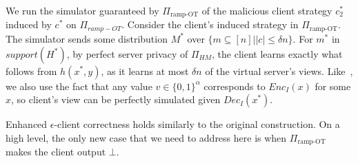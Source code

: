 \documentclass{llncs}
\begin{document}
{We run the simulator guaranteed by $\Pi_{\text{ramp-OT}}$ of the malicious client strategy $c^*_2$ induced by $c^*$ on $\Pi_{ramp-OT}$. 
Consider the client's induced strategy in $\Pi_{\text{ramp-OT}}$. The simulator sends some distribution $M^*$ over $\{m\subseteq [n]||c|\leq \delta n\}$.
For $m^*$ in $support(H^*)$, by perfect server privacy of $\Pi_{HM}$, the client learns exactly what follows from $h(x^*,y)$, as it learns at most $\delta n$ of the virtual server's views. Like~\cite{IKOPS11}, we also use the fact that any value $v\in \{0,1\}^{\alpha}$ corresponds to $Enc_I(x)$ for some $x$, so client's view can be perfectly simulated given $Dec_I(x^*)$.

Enhanced $\epsilon$-client correctness holds similarly to the original construction. On a high level, the only new case that we need to address here is when $\Pi_{\text{ramp-OT}}$ makes the client output $\bot$.

}
\end{document}
